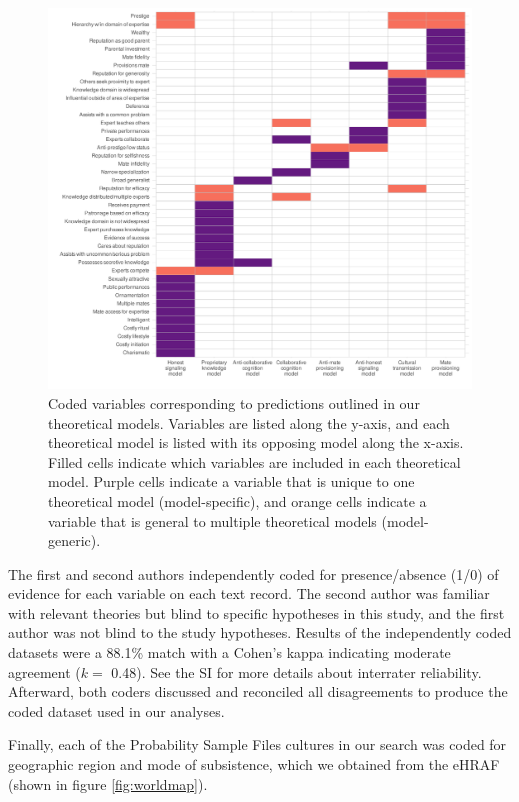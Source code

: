 \documentclass[
  11pt,
]{article}
\begin{document}
\begin{figure}

{\centering \includegraphics{conceptual-experts-paper_files/figure-latex/tilevars-1} 

}

\caption{Coded variables corresponding to predictions outlined in our theoretical models. Variables are listed along the y-axis, and each theoretical model is listed with its opposing model along the x-axis. Filled cells indicate which variables are included in each theoretical model. Purple cells indicate a variable that is unique to one theoretical model (model-specific), and orange cells indicate a variable that is general to multiple theoretical models (model-generic).}\label{fig:tilevars}
\end{figure}

The first and second authors independently coded for presence/absence (1/0) of evidence for each variable on each text record. The second author was familiar with relevant theories but blind to specific hypotheses in this study, and the first author was not blind to the study hypotheses. Results of the independently coded datasets were a 88.1\% match with a Cohen's kappa indicating moderate agreement (\(k=\) 0.48). See the SI for more details about interrater reliability. Afterward, both coders discussed and reconciled all disagreements to produce the coded dataset used in our analyses.

Finally, each of the Probability Sample Files cultures in our search was coded for geographic region and mode of subsistence, which we obtained from the eHRAF (shown in figure \ref{fig:worldmap}).
\end{document}
